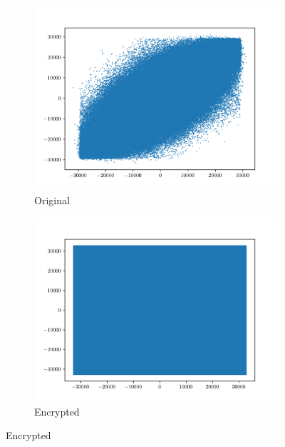 \documentclass[a4paper]{cas-sc}
\begin{document}
\begin{figure}[pos=h]
    \begin{subfigure}[h]{0.3\textwidth}
        \begin{center}
            \includegraphics[width=\textwidth]{embedded1Correlation.png}
            \caption{Original}
            \label{fig:embedded1Correlation}
        \end{center}
    \end{subfigure}
    \begin{subfigure}[h]{0.3\textwidth}
        \begin{center}
            \includegraphics[width=\textwidth]{encrypted1Correlation.png}
            \caption{Encrypted}
            \label{fig:encrypted1Correlation}

\end{center}
\end{subfigure}
\end{figure}
\end{document}
